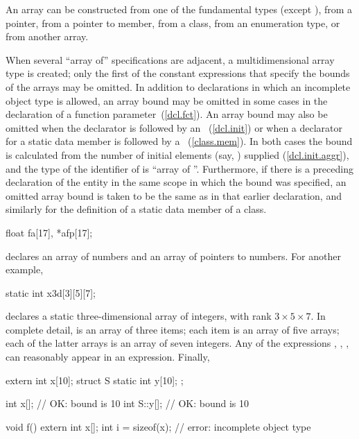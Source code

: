 \pnum
An array can be constructed from one of the fundamental types
(except
),
from a pointer,
from a pointer to member, from a class,
from an enumeration type,
or from another array.

\pnum
When several ``array of'' specifications are adjacent, a multidimensional
array type is created;
only the first of
the constant expressions that specify the bounds
of the arrays may be omitted.
In addition to declarations in which an incomplete object type is allowed,
an array bound may be omitted in some cases in the declaration of a function
parameter~(\ref{dcl.fct}).
An array bound may also be omitted
when the declarator is followed by an
~(\ref{dcl.init}) or
when a declarator for a static data member is followed by a
~(\ref{class.mem}).
In both cases the bound is calculated from the number
%
of initial elements (say,
)
supplied
(\ref{dcl.init.aggr}), and the type of the identifier of
is ``array of
''.
Furthermore, if there is a preceding declaration of the entity in the same
scope in which the bound was specified, an omitted array bound is taken to
be the same as in that earlier declaration, and similarly for the definition
of a static data member of a class.

\pnum
\begin{example}
%
%
\begin{codeblock}
float fa[17], *afp[17];
\end{codeblock}

declares an array of
numbers and an array of
pointers to
numbers.
%
For another example,

\begin{codeblock}
static int x3d[3][5][7];
\end{codeblock}

declares a static three-dimensional array of integers,
with rank $3 \times 5 \times 7$.
In complete detail,
is an array of three items;
each item is an array of five arrays;
each of the latter arrays is an array of seven
integers.
Any of the expressions
,
,
,
can reasonably appear in an expression. Finally,
\begin{codeblock}
extern int x[10];
struct S {
  static int y[10];
};

int x[];                // OK: bound is 10
int S::y[];             // OK: bound is 10

void f() {
  extern int x[];
  int i = sizeof(x);    // error: incomplete object type
}
\end{codeblock}
\end{example}

